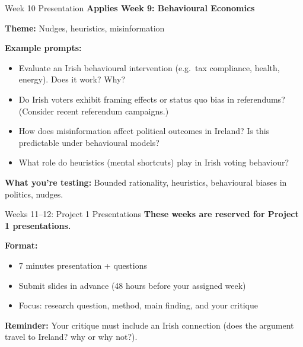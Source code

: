 \documentclass[10pt]{beamer}
\begin{document}
\begin{frame}{Week 10 Presentation}
\textbf{Applies Week 9: Behavioural Economics}

\textbf{Theme:} Nudges, heuristics, misinformation

\textbf{Example prompts:}
\begin{itemize}
\item Evaluate an Irish behavioural intervention (e.g.\ tax compliance, health, energy). Does it work? Why?
\item Do Irish voters exhibit framing effects or status quo bias in referendums? (Consider recent referendum campaigns.)
\item How does misinformation affect political outcomes in Ireland? Is this predictable under behavioural models?
\item What role do heuristics (mental shortcuts) play in Irish voting behaviour?
\end{itemize}

\textbf{What you're testing:} Bounded rationality, heuristics, behavioural biases in politics, nudges.
\end{frame}

\begin{frame}{Weeks 11--12: Project 1 Presentations}
\textbf{These weeks are reserved for Project 1 presentations.}

\textbf{Format:}
\begin{itemize}
\item 7 minutes presentation + questions
\item Submit slides in advance (48 hours before your assigned week)
\item Focus: research question, method, main finding, and your critique
\end{itemize}

\textbf{Reminder:} Your critique must include an Irish connection (does the argument travel to Ireland? why or why not?).
\end{frame}
\end{document}
